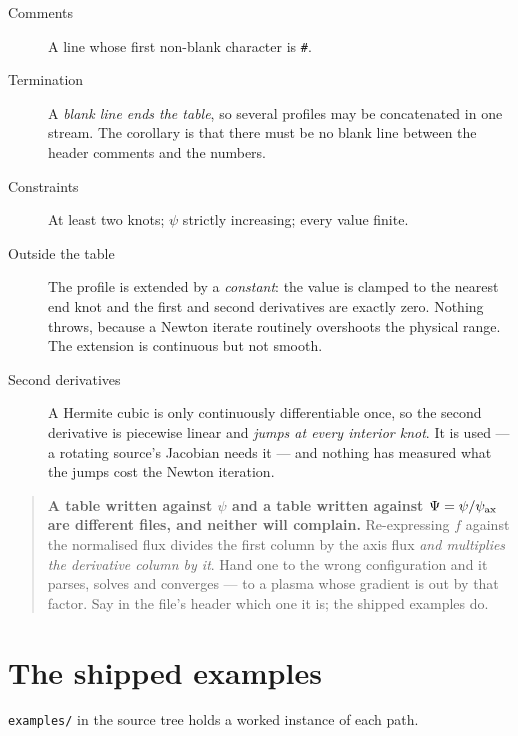 \begin{description}

\item[Comments] A line whose first non-blank character is \texttt{\#}.

\item[Termination] A \emph{blank line ends the table}, so several profiles may
	be concatenated in one stream. The corollary is that there must be no blank
	line between the header comments and the numbers.

\item[Constraints] At least two knots; $\psi$ strictly increasing; every value
	finite.

\item[Outside the table] The profile is extended by a \emph{constant}: the value
	is clamped to the nearest end knot and the first and second derivatives are
	exactly zero. Nothing throws, because a Newton iterate routinely overshoots
	the physical range. The extension is continuous but not smooth.

\item[Second derivatives] A Hermite cubic is only continuously differentiable
	once, so the second derivative is piecewise linear and \emph{jumps at every
	interior knot}. It is used --- a rotating source's Jacobian needs it --- and
	nothing has measured what the jumps cost the Newton iteration.

\end{description}

\begin{quote}
	\textbf{A table written against $\psi$ and a table written against
	$\Psi = \psi/\psi_{\mathrm{ax}}$ are different files, and neither will complain.}
	Re-expressing $f$ against the normalised flux divides the first column by
	the axis flux \emph{and multiplies the derivative column by it}. Hand one to
	the wrong configuration and it parses, solves and converges --- to a plasma
	whose gradient is out by that factor. Say in the file's header which one it
	is; the shipped examples do.
\end{quote}

\section{The shipped examples}

\texttt{examples/} in the source tree holds a worked instance of each path.

